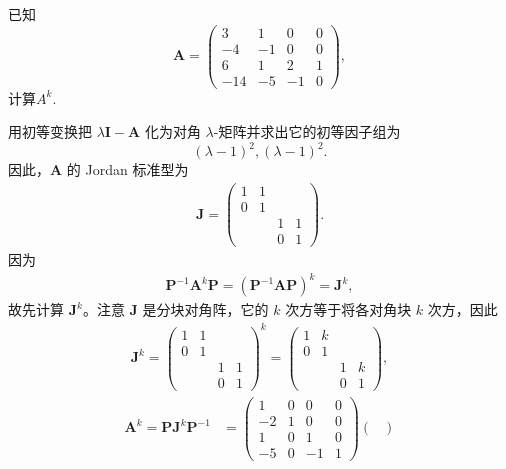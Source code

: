 \documentclass[../../main.tex]{subfiles}
\begin{document}
\begin{example}
已知
\[
\boldsymbol{A} = 
\begin{pmatrix}
3 & 1 & 0 & 0 \\
-4 & -1 & 0 & 0 \\
6 & 1 & 2 & 1 \\
-14 & -5 & -1 & 0
\end{pmatrix},
\] 
计算$A^k.$
\end{example}
\begin{solution}
用初等变换把 $\lambda\boldsymbol{I} - \boldsymbol{A}$ 化为对角 $\lambda$-矩阵并求出它的初等因子组为
\[
(\lambda - 1)^2, (\lambda - 1)^2.
\]
因此，$\boldsymbol{A}$ 的 Jordan 标准型为
\begin{align*}
\boldsymbol{J} = 
\begin{pmatrix}
1 & 1 & & \\
0 & 1 & & \\
 & & 1 & 1 \\
 & & 0 & 1
\end{pmatrix}.
\end{align*} 
因为
\begin{align*}
\boldsymbol{P}^{-1}\boldsymbol{A}^k\boldsymbol{P} = (\boldsymbol{P}^{-1}\boldsymbol{AP})^k = \boldsymbol{J}^k,
\end{align*}
故先计算 $\boldsymbol{J}^k$。注意 $\boldsymbol{J}$ 是分块对角阵，它的 $k$ 次方等于将各对角块 $k$ 次方，因此
\begin{align*}
\boldsymbol{J}^k = 
\begin{pmatrix}
1 & 1 & & \\
0 & 1 & & \\
    & & 1 & 1 \\
    & & 0 & 1
\end{pmatrix}^k
=
\begin{pmatrix}
1 & k & & \\
0 & 1 & & \\
    & & 1 & k \\
    & & 0 & 1
\end{pmatrix},
\end{align*}
\begin{align*}
\boldsymbol{A}^k = \boldsymbol{PJ}^k\boldsymbol{P}^{-1} 
&=
\begin{pmatrix}
1 & 0 & 0 & 0 \\
-2 & 1 & 0 & 0 \\
1 & 0 & 1 & 0 \\
-5 & 0 & -1 & 1
\end{pmatrix}
\begin{pmatrix}

\end{pmatrix}
\end{align*}
\end{solution}
\end{document}
